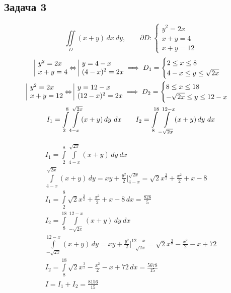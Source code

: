 \documentclass[a4paper,fleqn,12pt]{article}
\theoremstyle{definition}
\begin{document}
\subsection*{Задача 3}
$$\iint\limits_D (x+y) \, dx \ dy, \qquad \partial D: \begin{cases} y^2 = 2x \\ x+y = 4 \\ x+y = 12 \end{cases}$$
\begin{gather*}
\begin{array}{|l@{}}
y^2 = 2x \\
x+y = 4
\end{array} \Leftrightarrow
\begin{array}{|l@{}}
y = 4 - x \\
(4-x)^2 = 2x
\end{array} \implies D_1 =  \begin{cases} 2 \leq x \leq 8 \\ 4-x \leq y \leq \sqrt{2x} \end{cases} \\
\begin{array}{|l@{}}
y^2 = 2x \\
x+y = 12
\end{array} \Leftrightarrow
\begin{array}{|l@{}}
y = 12 - x \\
(12-x)^2 = 2x
\end{array} \implies D_2 =  \begin{cases} 8 \leq x \leq 18 \\ -\sqrt{2x} \leq y \leq 12-x \end{cases} \\
I_1 = \int\limits_2 ^8 \int\limits_{4-x} ^{\sqrt{2x}} (x+y)\, dy \ dx \qquad 
I_2 = \int\limits_8 ^{18} \int\limits_{-\sqrt{2x}} ^{12-x} (x+y)\, dy \ dx
\end{gather*}

\begin{gather*}
I_1 = \int\limits_2 ^8 \int\limits_{4-x} ^{\sqrt{2x}} (x+y)\, dy \ dx   \\
\int\limits_{4-x} ^{\sqrt{2x}} (x+y)\, dy  = 
xy + \frac{y^2}{2} \Big|_{4-x} ^{\sqrt{2x}} = 
\sqrt{2} x^{\frac{3}{2}} + \frac{x^2}{2} + x - 8 \\
I_1 = \int\limits_2 ^8  \sqrt{2} x^{\frac{3}{2}} + \frac{x^2}{2} + x - 8 \, dx  = \frac{826}{5} \\
I_2 = \int\limits_8 ^{18} \int\limits_{-\sqrt{2x}} ^{12-x} (x+y)\, dy \ dx \\
\int\limits_{-\sqrt{2x}} ^{12-x} (x+y)\, dy  = 
xy + \frac{y^2}{2} \Big|_{-\sqrt{2x}} ^{12-x} =
\sqrt{2} x^{\frac{3}{2}} - \frac{x^2}{2} - x + 72 \\
I_2 = \int\limits_8 ^{18} \sqrt{2} x^{\frac{3}{2}} - \frac{x^2}{2} - x + 72 \,dx = \frac{5678}{15}\\
I = I_1 + I_2 = \frac{8156}{15}
\end{gather*}
\end{document}
